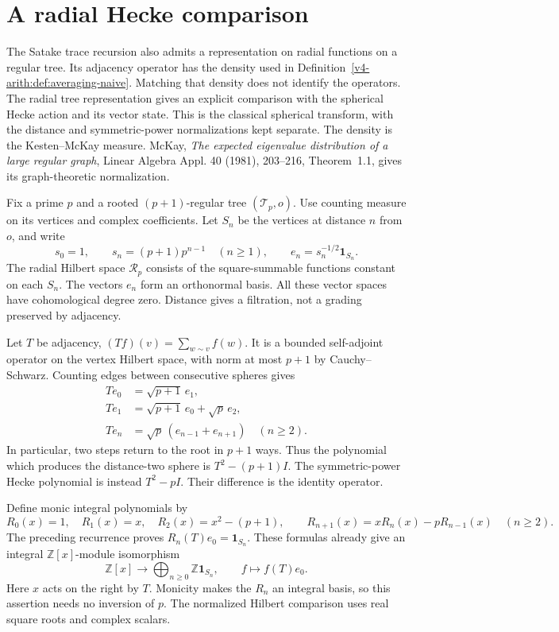 \section{A radial Hecke comparison}
\label{v4-arith:radial:section}

The Satake trace recursion also admits a representation on radial functions
on a regular tree.
Its adjacency operator has the density used in
Definition~\ref{v4-arith:def:averaging-naive}. Matching that density
does not identify the operators. The radial tree representation gives an
explicit comparison with the spherical Hecke action and its vector state.
This is the classical spherical transform, with the distance and
symmetric-power normalizations kept separate. The density is the
Kesten--McKay measure. McKay, \emph{The expected eigenvalue distribution
of a large regular graph}, Linear Algebra Appl. 40 (1981),
203--216, Theorem~1.1, gives its graph-theoretic normalization.

Fix a prime $p$ and a rooted $(p+1)$-regular tree $(\mathcal T_p,o)$.
Use counting measure on its vertices and complex coefficients.
Let $S_n$ be the vertices at distance $n$ from $o$, and write
\[
 s_0=1,\qquad s_n=(p+1)p^{n-1}\quad(n\ge1),\qquad
 e_n=s_n^{-1/2}\mathbf{1}_{S_n}.
\]
The radial Hilbert space $\mathcal R_p$ consists of the square-summable
functions constant on each $S_n$. The vectors $e_n$ form an orthonormal
basis. All these vector spaces have cohomological degree zero.
Distance gives a filtration, not a grading preserved by adjacency.

Let $T$ be adjacency, $(Tf)(v)=\sum_{w\sim v}f(w)$.
It is a bounded self-adjoint operator on the vertex Hilbert space,
with norm at most $p+1$ by Cauchy--Schwarz.
Counting edges between consecutive spheres gives
\begin{align}
 Te_0&=\sqrt{p+1}\,e_1,\\
 Te_1&=\sqrt{p+1}\,e_0+\sqrt p\,e_2,\\
 Te_n&=\sqrt p\,(e_{n-1}+e_{n+1})\quad(n\ge2).
 \label{v4-arith:radial:recurrence}
\end{align}
In particular, two steps return to the root in $p+1$ ways.
Thus the polynomial which produces the distance-two sphere is
$T^2-(p+1)I$. The symmetric-power Hecke polynomial is instead
$T^2-pI$. Their difference is the identity operator.

Define monic integral polynomials by
\[
 R_0(x)=1,\quad R_1(x)=x,\quad R_2(x)=x^2-(p+1),\qquad
 R_{n+1}(x)=xR_n(x)-pR_{n-1}(x)\quad(n\ge2).
\]
The preceding recurrence proves
$R_n(T)e_0=\mathbf{1}_{S_n}$. These formulas already give an integral
$\mathbb Z[x]$-module isomorphism
\[
 \mathbb Z[x]\longrightarrow
 \bigoplus_{n\ge0}\mathbb Z\mathbf{1}_{S_n},\qquad
 f\longmapsto f(T)e_0.
\]
Here $x$ acts on the right by $T$. Monicity makes the $R_n$ an integral
basis, so this assertion needs no inversion of $p$.
The normalized Hilbert comparison uses real square roots and complex scalars.

